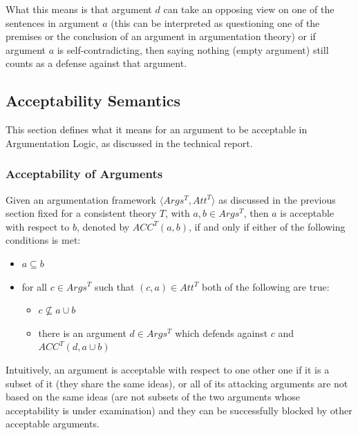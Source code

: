 \documentclass[11pt,twoside,a4paper]{report}
\begin{document}
What this means is that argument $d$ can take an opposing view on one of the sentences in argument $a$ (this can be interpreted as questioning one of the premises or the conclusion of an argument in argumentation theory) or if argument $a$ is self-contradicting, then saying nothing (empty argument) still counts as a defense against that argument.

\subsection{Acceptability Semantics}
This section defines what it means for an argument to be acceptable in Argumentation Logic, as discussed in the technical report.

\subsubsection{Acceptability of Arguments}
Given an argumentation framework $\langle Args^T, Att^T\rangle$ as discussed in the previous section fixed for a consistent theory $T$, with $a,b\in Args^T$, then $a$ is acceptable with respect to $b$, denoted by $ACC^T(a,b)$, if and only if either of the following conditions is met:
\begin{itemize}
\item
$a\subseteq b$
\item
for all $c\in Args^T$ such that $(c,a)\in Att^T$ both of the following are true:
\begin{itemize}
\item
$c\nsubseteq a\cup b$
\item
there is an argument $d\in Args^T$ which defends against $c$ and $ACC^T(d,a\cup b)$
\end{itemize}
\end{itemize}

Intuitively, an argument is acceptable with respect to one other one if it is a subset of it (they share the same ideas), or all of its attacking arguments are not based on the same ideas (are not subsets of the two arguments whose acceptability is under examination) and they can be successfully blocked by other acceptable arguments.
\end{document}
